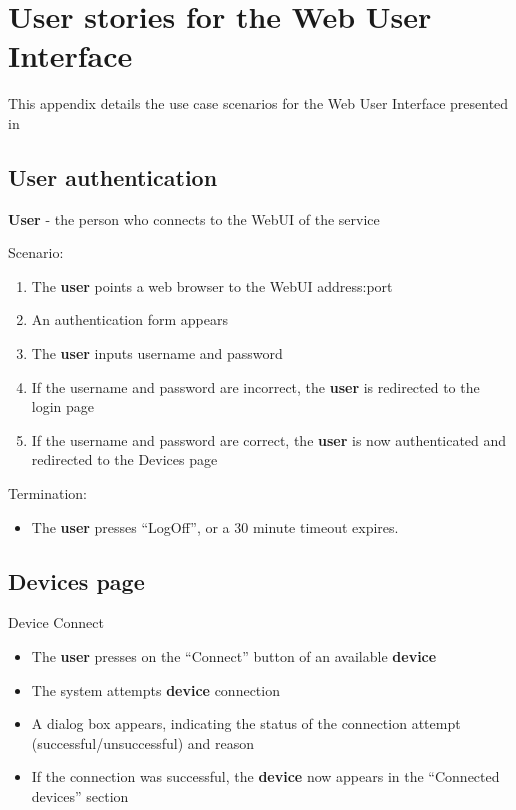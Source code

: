 \chapter{User stories for the Web User Interface}
\label{app:user-stories}

This appendix details the use case scenarios for the Web User Interface presented in 

\section{User authentication}

\textbf{User} - the person who connects to the WebUI of the service

Scenario:
\begin{enumerate}
\item The \textbf{user} points a web browser to the WebUI address:port
\item An authentication form appears
\item The \textbf{user} inputs username and password
\item If the username and password are incorrect, the \textbf{user} is redirected to the login page
\item If the username and password are correct, the \textbf{user} is now authenticated and redirected to the Devices page
\end{enumerate}

Termination:
\begin{itemize}
\item The \textbf{user} presses “LogOff”, or a 30 minute timeout expires.
\end{itemize}

\section{Devices page}

Device Connect
\begin{itemize}
\item The \textbf{user} presses on the “Connect” button of an available \textbf{device}
\item The system attempts \textbf{device} connection
\item A dialog box appears, indicating the status of the connection attempt (successful/unsuccessful) and reason
\item If the connection was successful, the \textbf{device} now appears in the “Connected devices” section
\end{itemize}

